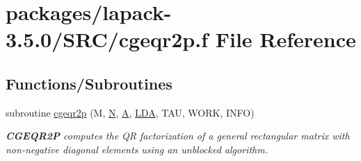 \hypertarget{cgeqr2p_8f}{}\section{packages/lapack-\/3.5.0/\+S\+R\+C/cgeqr2p.f File Reference}
\label{cgeqr2p_8f}
\subsection*{Functions/\+Subroutines}
\begin{DoxyCompactItemize}
\item 
subroutine \hyperlink{group__complexGEcomputational_ga5b971cf36596a0145b900eea05be8771}{cgeqr2p} (M, \hyperlink{polmisc_8c_a0240ac851181b84ac374872dc5434ee4}{N}, \hyperlink{classA}{A}, \hyperlink{example__user_8c_ae946da542ce0db94dced19b2ecefd1aa}{L\+D\+A}, T\+A\+U, W\+O\+R\+K, I\+N\+F\+O)
\begin{DoxyCompactList}\small\item\em {\bfseries C\+G\+E\+Q\+R2\+P} computes the Q\+R factorization of a general rectangular matrix with non-\/negative diagonal elements using an unblocked algorithm. \end{DoxyCompactList}\end{DoxyCompactItemize}
